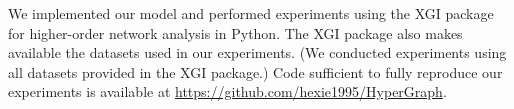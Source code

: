 We implemented our model and performed experiments using the XGI package \cite{landryXGIPythonPackage2023} for higher-order network analysis in  Python. 
The XGI package also makes available the datasets used in our experiments. (We conducted experiments using all datasets provided in the XGI package.)
Code sufficient to fully reproduce our experiments is available at \url{https://github.com/hexie1995/HyperGraph}.
